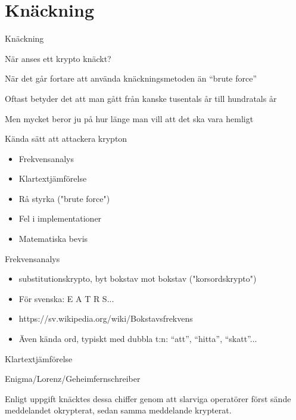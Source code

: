 \documentclass{beamer}
\begin{document}
\section{Knäckning}

\begin{frame}{Knäckning}
\begin{center}
  När anses ett krypto knäckt?
\end{center}
\pause 
\begin{center}
  När det går fortare att använda knäckningsmetoden än ``brute force''
\end{center}
\pause 
\begin{center}
  Oftast betyder det att man gått från kanske tusentals år till hundratals år
\end{center}
\pause 
\begin{center}
  Men mycket beror ju på hur länge man vill att det ska vara hemligt
\end{center}
\end{frame}

\begin{frame}{Kända sätt att attackera krypton}
\begin{itemize}
\item  Frekvensanalys
\pause \item Klartextjämförelse
\pause \item Rå styrka ("brute force")
\pause \item Fel i implementationer
\pause \item Matematiska bevis
\end{itemize}
\end{frame}

\begin{frame}{Frekvensanalys}
\begin{itemize}
\item  substitutionskrypto, byt bokstav mot bokstav ("korsordskrypto")
\pause \item För svenska: E A T R S...
\pause \item https://sv.wikipedia.org/wiki/Bokstavsfrekvens
\pause \item Även kända ord, typiskt med dubbla t:n: ``att'', ``hitta'', ``skatt''...
\end{itemize}
\end{frame}

\begin{frame}{Klartextjämförelse}
\begin{center}
Enigma/Lorenz/Geheimfernschreiber
\end{center}
\begin{center}
Enligt uppgift knäcktes dessa chiffer genom att slarviga operatörer först sände
meddelandet okrypterat, sedan samma meddelande krypterat.
\end{center}
\end{frame}
\end{document}
